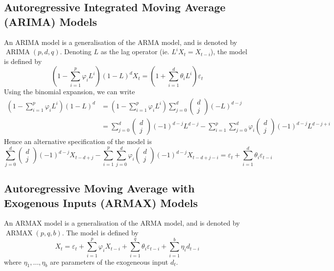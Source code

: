 \documentclass[11pt]{report} %
\begin{document}
\subsection{Autoregressive Integrated Moving Average (ARIMA) Models}
An ARIMA model is a generalisation of the ARMA model, and is denoted by $\operatorname{ARIMA}\left(p, d, q\right)$. Denoting $L$ as the lag operator (ie. $L^{i}X_{t} = X_{t - i}$), the model is defined by
\begin{equation}
\left(1 - \sum_{i = 1}^{p}\varphi_{i}L^{i}\right)\left(1 - L\right)^{d}X_{t} = \left(1 + \sum_{i = 1}^{d}\theta_{i}L^{i}\right)\varepsilon_{t}
\end{equation}
Using the binomial expansion, we can write
\begin{align}
\left(1 - \sum_{i = 1}^{p}\varphi_{i}L^{i}\right)\left(1 - L\right)^{d} &= \left(1 - \sum_{i = 1}^{p}\varphi_{i}L^{i}\right)\sum_{j = 0}^{d} \begin{pmatrix}
d \\ j
\end{pmatrix} \left(-L\right)^{d - j}  \\
&= \sum_{j = 0}^{d} \begin{pmatrix}
d \\ j
\end{pmatrix} \left(-1\right)^{d - j}L^{d - j} - \sum_{i = 1}^{p}\sum_{j = 0}^{d}\varphi_{i}\begin{pmatrix}
d \\ j
\end{pmatrix}\left(-1\right)^{d- j}L^{d - j + i}
\end{align}
Hence an alternative specification of the model is
\begin{equation}
\sum_{j = 0}^{d} \begin{pmatrix}
d \\ j
\end{pmatrix} \left(-1\right)^{d - j}X_{t - d + j} - \sum_{i = 1}^{p}\sum_{j = 0}^{d}\varphi_{i}\begin{pmatrix}
d \\ j
\end{pmatrix}\left(-1\right)^{d- j}X_{t - d + j - i} = \varepsilon_{t} + \sum_{i = 1}^{d}\theta_{i}\varepsilon_{t - i}
\end{equation}

\subsection{Autoregressive Moving Average with Exogenous Inputs (ARMAX) Models}
An ARMAX model is a generalisation of the ARMA model, and is denoted by $\operatorname{ARMAX}\left(p, q, b\right)$. The model is defined by
\begin{equation}
X_{t} = \varepsilon_{t} + \sum_{i = 1}^{p}\varphi_{i}X_{t - i} + \sum_{i = 1}^{q}\theta_{i}\varepsilon_{t - i} + \sum_{i = 1}^{b}\eta_{i}d_{t - i}
\end{equation}
where $\eta_{1}, \dots, \eta_{b}$ are parameters of the exogeneous input $d_{t}$.
\end{document}
